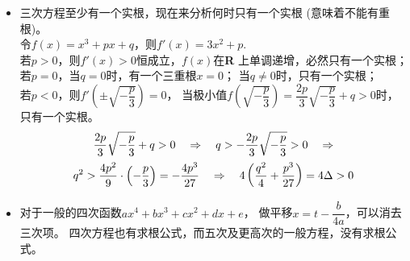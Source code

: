 \begin{itemize}[leftmargin=\inteval{\myitemleftmargin}pt,itemsep=
   \inteval{\myitemitempsep}pt,topsep=\inteval{\myitemtopsep}pt]
\begin{align}
    \dfrac{b}{108a^4}\left(-18acd+4b^2d-bc^2\right)     \notag
\end{align}
解二次方程可得：
$ u^3=-\dfrac{q}{2} + \sqrt{\Delta},\ v^3=-\dfrac{q}{2} - \sqrt{\Delta}$.
再令$ \omega=-\dfrac{1}{2}+\dfrac{\sqrt{3}}{2}\i =
\cos\left(\dfrac{2\pi}{3}\right)+\i\sin\left(\dfrac{2\pi}{3}\right)
=\e^{\i\frac{2\pi}{3}}$，则$ \omega^3=1 $， 那么三次方程$ x^3+px+q=0 $的求根公式可表达如下：
\begin{align*}
\begin{dcases}
    x_1= \sqrt[3]{-\dfrac{q}{2} + \sqrt{\Delta}}+
    \sqrt[3]{-\dfrac{q}{2} - \sqrt{\Delta}} \\
    x_2= \omega\sqrt[3]{-\dfrac{q}{2} + \sqrt{\Delta}}+
    \omega^2\sqrt[3]{-\dfrac{q}{2} - \sqrt{\Delta}} \\
    x_3= \omega^2\sqrt[3]{-\dfrac{q}{2} + \sqrt{\Delta}}+
    \omega\sqrt[3]{-\dfrac{q}{2} - \sqrt{\Delta}} 
\end{dcases} 
\end{align*}
大家可能觉得$ \Delta=\dfrac{q^2}{4}+\dfrac{p^3}{27} $难以记忆，
其实，只要使用量纲分析，就不算困难。对于三次方程$ x^3+px+q=0 $，
如果认为$ x $代表长度，那么$ p $就是面积(长度的2次方)，
$ q $就是体积(长度的3次方)，
$ p^3 $和$ q^2 $具有相同的单位(都是长度的6次方)，
否则两者不能进行加法运算，再把$ \Delta $写成
$ \Delta=\dfrac{q^2}{2^2}+\dfrac{p^3}{3^3} $就好记了。

\item 三次方程至少有一个实根，现在来分析何时只有一个实根
(意味着不能有重根)。\\ 
令$f(x)=x^3+px+q$，则$f'(x)=3x^2+p$. \\
 若$p>0$，则$f'(x)>0$恒成立，$f(x)$在\textbf{R}
上单调递增，必然只有一个实根；\\
 若$p=0$，当$q=0$时，有一个三重根$x=0$；
当$q\neq 0$时，只有一个实根；\\
 若$p<0$，则$f'\left(\pm\sqrt{-\dfrac{p}{3}}\right)=0$，
当极小值$f\left(\sqrt{-\dfrac{p}{3}}\right)=\dfrac{2p}{3}
\sqrt{-\dfrac{p}{3}}+q>0$时，只有一个实根。
\begin{gather*}
    \dfrac{2p}{3}\sqrt{-\dfrac{p}{3}}+q>0  \quad \Rightarrow \quad 
    q>-\dfrac{2p}{3}\sqrt{-\dfrac{p}{3}}>0 \quad \Rightarrow \\
    q^2 >\dfrac{4p^2}{9}\cdot \left(-\dfrac{p}{3}\right)=
    -\dfrac{4p^3}{27}  \quad \Rightarrow \quad 
    4\left(\dfrac{q^2}{4}+\dfrac{p^3}{27}\right)=4\Delta>0
\end{gather*}

\item 对于一般的四次函数$ ax^4+bx^3+cx^2+dx+e $，
做平移$ x=t-\dfrac{b}{4a} $，可以消去三次项。
四次方程也有求根公式，而五次及更高次的一般方程，没有求根公式。


\end{itemize}
